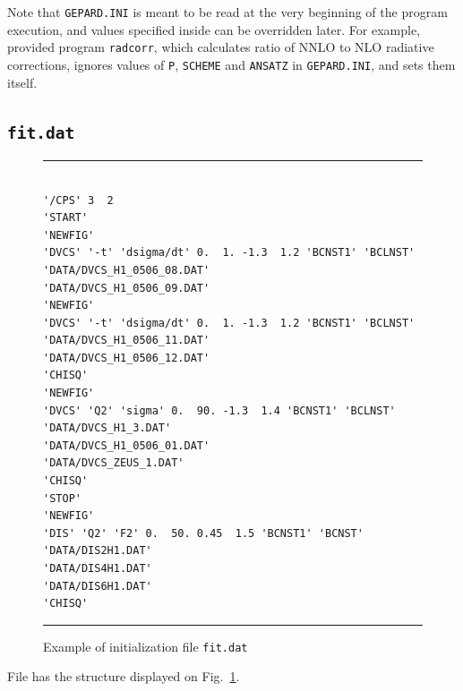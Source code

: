 \documentclass[12pt]{article}
\begin{document}
Note that \texttt{GEPARD.INI} is meant to be read at the very beginning of the
program execution, and values specified inside can be overridden later. For
example, provided program \texttt{radcorr}, which calculates ratio of NNLO to NLO
radiative corrections, ignores values of \texttt{P}, \texttt{SCHEME} and
\texttt{ANSATZ} in \texttt{GEPARD.INI}, and sets them itself.


\subsection{\texttt{fit.dat}\label{ssect:fitdat}}

\begin{figure}[t]
\begin{center}
\hrule
\begin{verbatim}

'/CPS' 3  2
'START'
'NEWFIG'
'DVCS' '-t' 'dsigma/dt' 0.  1. -1.3  1.2 'BCNST1' 'BCLNST'
'DATA/DVCS_H1_0506_08.DAT'
'DATA/DVCS_H1_0506_09.DAT'
'NEWFIG'
'DVCS' '-t' 'dsigma/dt' 0.  1. -1.3  1.2 'BCNST1' 'BCLNST'
'DATA/DVCS_H1_0506_11.DAT'
'DATA/DVCS_H1_0506_12.DAT'
'CHISQ'
'NEWFIG'
'DVCS' 'Q2' 'sigma' 0.  90. -1.3  1.4 'BCNST1' 'BCLNST'
'DATA/DVCS_H1_3.DAT'
'DATA/DVCS_H1_0506_01.DAT'
'DATA/DVCS_ZEUS_1.DAT'
'CHISQ'
'STOP'
'NEWFIG'
'DIS' 'Q2' 'F2' 0.  50. 0.45  1.5 'BCNST1' 'BCNST'
'DATA/DIS2H1.DAT'
'DATA/DIS4H1.DAT'
'DATA/DIS6H1.DAT'
'CHISQ'

\end{verbatim}
\hrule
\end{center}
\caption{Example of initialization file \texttt{fit.dat}}
\label{fig:fit.dat}
\end{figure}

File has the structure displayed on Fig.~\ref{fig:fit.dat}.
\end{document}
